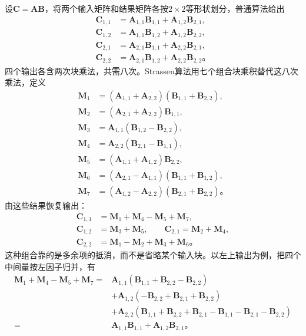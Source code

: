 设$\bm C=\bm A\bm B$，将两个输入矩阵和结果矩阵各按$2\times2$等形状划分，普通算法给出
\begin{equation}
  \begin{aligned}
    \bm C_{1,1}&=\bm A_{1,1}\bm B_{1,1}+\bm A_{1,2}\bm B_{2,1},\\
    \bm C_{1,2}&=\bm A_{1,1}\bm B_{1,2}+\bm A_{1,2}\bm B_{2,2},\\
    \bm C_{2,1}&=\bm A_{2,1}\bm B_{1,1}+\bm A_{2,2}\bm B_{2,1},\\
    \bm C_{2,2}&=\bm A_{2,1}\bm B_{1,2}+\bm A_{2,2}\bm B_{2,2}\text{。}
  \end{aligned}
  \label{eq:cnn-classical-block-product}
\end{equation}
四个输出各含两次块乘法，共需八次。Strassen算法用七个组合块乘积替代这八次乘法，定义
\begin{equation}
  \begin{aligned}
    \bm M_1&=(\bm A_{1,1}+\bm A_{2,2})(\bm B_{1,1}+\bm B_{2,2}),\\
    \bm M_2&=(\bm A_{2,1}+\bm A_{2,2})\bm B_{1,1},\\
    \bm M_3&=\bm A_{1,1}(\bm B_{1,2}-\bm B_{2,2}),\\
    \bm M_4&=\bm A_{2,2}(\bm B_{2,1}-\bm B_{1,1}),\\
    \bm M_5&=(\bm A_{1,1}+\bm A_{1,2})\bm B_{2,2},\\
    \bm M_6&=(\bm A_{2,1}-\bm A_{1,1})(\bm B_{1,1}+\bm B_{1,2}),\\
    \bm M_7&=(\bm A_{1,2}-\bm A_{2,2})(\bm B_{2,1}+\bm B_{2,2})\text{。}
  \end{aligned}
  \label{eq:cnn-strassen-products}
\end{equation}
由这些结果恢复输出：
\begin{equation}
  \begin{aligned}
    \bm C_{1,1}&=\bm M_1+\bm M_4-\bm M_5+\bm M_7,\\
    \bm C_{1,2}&=\bm M_3+\bm M_5,\qquad
    \bm C_{2,1}=\bm M_2+\bm M_4,\\
    \bm C_{2,2}&=\bm M_1-\bm M_2+\bm M_3+\bm M_6\text{。}
  \end{aligned}
  \label{eq:cnn-strassen-recovery}
\end{equation}
这种组合靠的是多余项的抵消，而不是省略某个输入块。以左上输出为例，把四个中间量按左因子归并，有
\begin{equation}
  \begin{aligned}
    \bm M_1+\bm M_4-\bm M_5+\bm M_7
    ={}&\bm A_{1,1}(\bm B_{1,1}+\bm B_{2,2}-\bm B_{2,2})\\
       &+\bm A_{1,2}(-\bm B_{2,2}+\bm B_{2,1}+\bm B_{2,2})\\
       &+\bm A_{2,2}(\bm B_{1,1}+\bm B_{2,2}
                       +\bm B_{2,1}-\bm B_{1,1}
                       -\bm B_{2,1}-\bm B_{2,2})\\
    ={}&\bm A_{1,1}\bm B_{1,1}+\bm A_{1,2}\bm B_{2,1}\text{。}
  \end{aligned}
  \label{eq:cnn-strassen-cancellation}
\end{equation}
